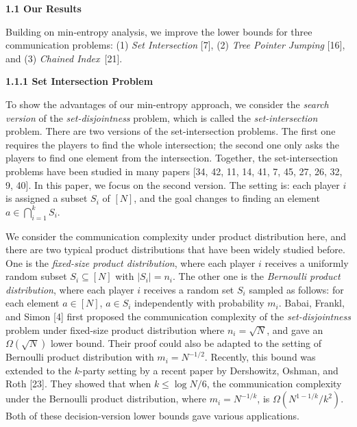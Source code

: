 \documentclass[10pt,a4paper]{article}
\begin{document}
\par\medskip\noindent\textbf{
1.1 Our Results}\par




Building on min-entropy analysis, we improve the lower bounds for three communication problems: (1) \emph{Set Intersection} [7], (2) \emph{Tree Pointer Jumping} [16],
and (3) \emph{Chained Index} [21].\par




\par\medskip\noindent\textbf{
1.1.1 Set Intersection Problem}\par




To show the advantages of our min-entropy approach, we consider the \emph{search version} of the \emph{set-disjointness} problem, which is called the \emph{set-intersection} problem. There are two versions of the set-intersection problems. The first one requires the players to find the whole intersection; the second one only asks the players to find one element from the intersection. Together, the set-intersection problems have been studied in many papers [34, 42, 11, 14, 41, 7, 45, 27, 26, 32, 9, 40]. In this paper, we focus on the second version. The setting is: each player $i$ is assigned a subset $S_{i}$ of $[N]$, and the goal changes to finding an element $a\in\bigcap_{i=1}^{k}S_{i}$.\par




We consider the communication complexity under product distribution here, and there are two typical product distributions that have been widely studied before. One is the \emph{fixed-size product distribution}, where each player $i$ receives a uniformly random subset $S_{i}\subseteq[N]$ with $|S_{i}|=n_{i}$. The other one is the \emph{Bernoulli product distribution}, where each player $i$ receives a random set $S_{i}$ sampled as follows: for each element $a\in[N]$, $a\in S_{i}$ independently with probability $m_{i}$. Babai, Frankl, and Simon [4] first proposed the communication complexity of the \emph{set-disjointness} problem under fixed-size product distribution where $n_{i}=\sqrt{N}$, and gave an $\Omega(\sqrt{N})$ lower bound. Their proof could also be adapted to the setting of Bernoulli product distribution with $m_{i}=N^{-1/2}$. Recently, this bound was extended to the $k$-party setting by a recent paper by Dershowitz, Oshman, and Roth [23]. They showed that when $k\leq\log N/6$, the communication complexity under the Bernoulli product distribution, where $m_{i}=N^{-1/k}$, is $\Omega(N^{1-1/k}/k^{2})$. Both of these decision-version lower bounds gave various applications.\par
\end{document}
